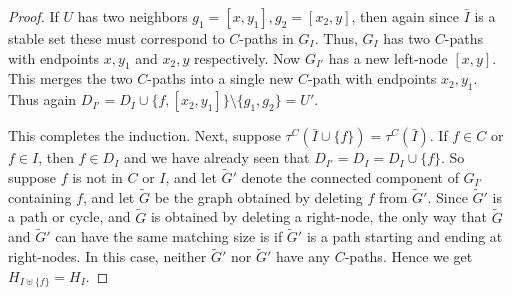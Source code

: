 \documentclass[11pt]{article}
\begin{document}
\begin{proof}
 If $U$ has two neighbors $g_1 = [x, y_1], g_2 = [x_2, y]$, then again since $\bar I$ is a stable set these must correspond to $C$-paths in $G_{I}$. Thus, $G_{I}$ has two $C$-paths with endpoints $x, y_1$ and $x_2, y$ respectively. Now $G_{I'}$ has a new left-node $[x,y]$. This merges the two $C$-paths into a single new $C$-path with endpoints $x_2, y_1$. Thus again $D_{I'} = D_{I} \cup \{ f, [x_2, y_1] \} \setminus \{g_1, g_2 \}  = U'$.
 
 This completes the induction. Next, suppose $\tau^C(\bar I \cup \{f \}) = \tau^C(\bar I)$. If $f \in C$ or $f \in I$, then  $f \in D_{I}$ and we have already seen that $D_{I'} = D_{I} = D_I \cup \{f \}$. So suppose $f$ is not in $C$ or $I$,  and let $\tilde G'$ denote the connected component  of $G_{I'}$ containing  $f$, and let $\tilde G$ be the  graph obtained by deleting $f$ from $\tilde G'$.  Since $\tilde G'$ is a path or cycle, and $\tilde G$ is obtained by deleting a right-node, the only way that $\tilde G$ and $\tilde G'$ can have the same matching size is if  $\tilde G'$ is a path starting and ending at right-nodes. In this case, neither $\tilde G'$ nor $\tilde G'$ have any $C$-paths. Hence we get $H_{I \uplus \{f \}}  = H_{I}$. 
\end{proof}
\end{document}
